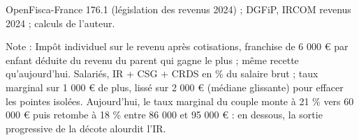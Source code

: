 OpenFisca-France 176.1 (législation des revenus 2024) ; DGFiP, IRCOM revenus 2024 ; calculs de l'auteur.\par Note : Impôt individuel sur le revenu après cotisations, franchise de 6 000 \euro{} par enfant déduite du revenu du parent qui gagne le plus ; même recette qu'aujourd'hui. Salariés, IR + CSG + CRDS en \% du salaire brut ; taux marginal sur 1 000 \euro{} de plus, lissé sur 2 000 \euro{} (médiane glissante) pour effacer les pointes isolées. Aujourd'hui, le taux marginal du couple monte à 21 \% vers 60 000 \euro{} puis retombe à 18 \% entre 86 000 et 95 000 \euro{} : en dessous, la sortie progressive de la décote alourdit l'IR.

